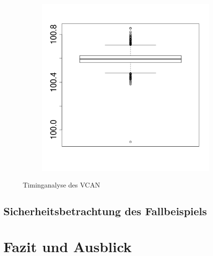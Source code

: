 \documentclass[
  a4paper,					    %
  twoside,
  DIV=calc,     				%
  bibliography=totoc,
  cleardoublepage=empty,
  ngerman,     					%
  final       					%
]{scrbook}
\begin{document}
\begin{figure}
\begin{subfigure}[b]{0.49\textwidth}
        \includegraphics[width=\textwidth]{boxplot_vcan}
        \caption{}
        \label{fig:}
    \end{subfigure}
    \caption{Timinganalyse des VCAN}
    \label{fig:timinganalyse}
\end{figure}



\section{Sicherheitsbetrachtung des Fallbeispiels}
\label{sec:Sicherheit_Beispiel}











\chapter{Fazit und Ausblick}
\label{sec:FazitAusblick}
\end{document}
